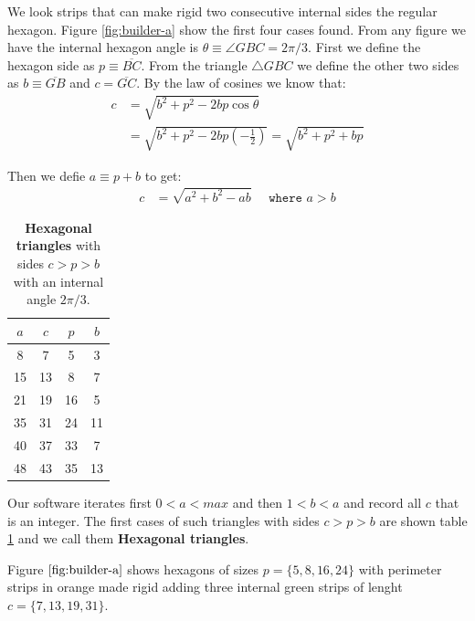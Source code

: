 \documentclass[11pt]{article}
\begin{document}
We look strips that can make rigid two consecutive internal sides the regular hexagon. Figure \ref{fig:builder-a} show the first four cases found. From any figure we have the internal hexagon angle is $\theta \equiv \angle{GBC} = 2\pi/3$. First we define the hexagon side as $p \equiv \overline{BC}$. From the triangle $\triangle{GBC}$ we define the other two sides as $b \equiv \overline{GB}$ and $c = \overline{GC}$. By the law of cosines we know that:
\begin{align}
c &= \sqrt{b^2 + p^2 - 2bp\cos\theta} \nonumber\\
 &= \sqrt{b^2 + p^2 - 2bp\left(-\frac{1}{2}\right)}
 = \sqrt{b^2 + p^2 + bp} \label{eq:triplet-cpb}
\end{align}

Then we defie $a \equiv p + b$ to get:
\begin{align}
c &= \sqrt{a^2 + b^2 - ab} \quad \texttt{ where } a > b
\end{align}

\begin{table}[H]
\begin{center}

\begin{tabular}{| c | c c c |}
\hline
$a$ & $c$ & $p$ & $b$ \\ [0.5ex]
\hline\hline
8 & 7 & 5 & 3 \\ \hline
15 & 13 & 8 & 7 \\ \hline
21 & 19 & 16 & 5 \\ \hline
35 & 31 & 24 & 11 \\ \hline
40 & 37 & 33 & 7 \\ \hline
48 & 43 & 35 & 13 \\ \hline
\end{tabular}

\caption{\textbf{Hexagonal triangles} with sides $c > p > b$ with an internal angle $2\pi/3$.}
\label{tbl:triplets}
\end{center}
\end{table}

Our software iterates first $0 < a < max$ and then $1 < b < a$ and record all $c$ that is an integer. The first cases of such triangles with sides $c > p > b$ are shown table \ref{tbl:triplets} and we call them \textbf{Hexagonal triangles}.

Figure $\ref{fig:builder-a}$ shows hexagons of sizes $p = \{5,8,16,24\}$ with perimeter strips in orange made rigid adding three internal green strips of lenght $c = \{7,13,19,31\}$. 
\end{document}
